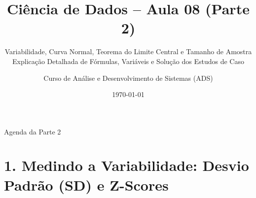 \documentclass[10pt, aspectratio=169]{beamer}
\title[Ciência de Dados: Variabilidade e TLC]{Ciência de Dados -- Aula 08 (Parte 2)}
\subtitle{Variabilidade, Curva Normal, Teorema do Limite Central e Tamanho de Amostra\\{\small Explicação Detalhada de Fórmulas, Variáveis e Solução dos Estudos de Caso}}
\author[ADS]{Curso de Análise e Desenvolvimento de Sistemas (ADS)}
\institute[ADS]{Disciplina: Ciência de Dados}
\date{\today}
\begin{document}
\begin{frame}
    \titlepage
\end{frame}

\begin{frame}{Agenda da Parte 2}
    \tableofcontents
\end{frame}

\section{1. Medindo a Variabilidade: Desvio Padrão (SD) e Z-Scores}
\end{document}

